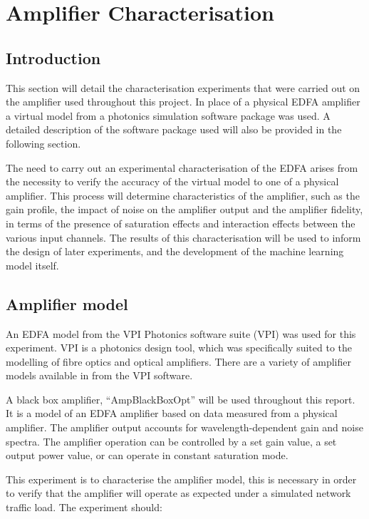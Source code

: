 \newpage
\section{Amplifier Characterisation}
\label{tw:amp_char}


\subsection{Introduction}
This section will detail the characterisation experiments that were carried out on the amplifier used throughout this project. In place of a physical EDFA amplifier a virtual model from a photonics simulation software package was used. A detailed description of the software package used will also be provided in the following section.	

The need to carry out an experimental characterisation of the EDFA arises from the necessity to verify the accuracy of the virtual model to one of a physical amplifier. This process will determine characteristics of the amplifier, such as the gain profile, the impact of noise on the amplifier output and the amplifier fidelity, in terms of the presence of saturation effects and interaction effects between the various input channels. The results of this characterisation will be used to inform the design of later experiments, and the development of the machine learning model itself.

\subsection{Amplifier model}
An EDFA model from the VPI Photonics software suite (VPI) was used for this experiment. VPI is a photonics design tool, which was specifically suited to the modelling of fibre optics and optical amplifiers. There are a variety of amplifier models available in from the VPI software. 

A black box amplifier, “AmpBlackBoxOpt” will be used throughout this report. It is a model of an EDFA amplifier based on data measured from a physical amplifier. The amplifier output accounts for wavelength-dependent gain and noise spectra. The amplifier operation can be controlled by a set gain value, a set output power value, or can operate in constant saturation mode.

This experiment is to characterise the amplifier model, this is necessary in order to verify that the amplifier will operate as expected under a simulated network traffic load.  The experiment should:

